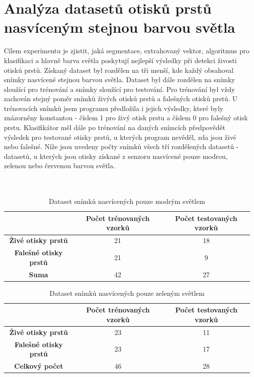\section{Analýza datasetů otisků prstů nasvíceným stejnou barvou světla}
Cílem experimentu je zjistit, jaká segmentace, extrahovaný vektor, algoritmus pro klasifikaci a hlavně barva světla poskytují nejlepší výsledky při detekci živosti otisků prstů. Získaný dataset byl rozdělen na tři menší, kde každý obsahoval snímky nasvícené stejnou barvou světla. Dataset byl dále rozdělen na snímky sloužící pro trénování a snímky sloužící pro testování. Pro trénování byl vždy zachován stejný poměr snímků živých otisků prstů a falešných otisků prstů. U trénovacích snímků jsem programu předložila i jejich výsledky, které byly znázorněny konstantou - číslem 1 pro živý otisk prstu a číslem 0 pro falešný otisk prstu. Klasifikátor měl dále po trénování na daných snímcích předpovědět výsledek pro testované otisky prstů, u kterých program nevěděl, zda jsou živé nebo falešné. Níže jsou uvedeny počty snímků všech tří rozdělených datasetů - datasetů, u kterých jsou otisky získané z senzoru nasvícené pouze modrou, zelenou nebo červenou barvou světla. \\\\\

\capstartfalse
\begin{table}[!htbp]
\centering
\begin{tabular}{|c|c|c|}
\hline
\textbf{}                     & \textbf{Počet trénovaných vzorků} & \textbf{Počet testovaných vzorků} \\ \hline
\textbf{Živé otisky prstů}    & 21                                & 18                                \\ \hline
\textbf{Falešné otisky prstů} & 21                                & 9                                \\ \hline
\textbf{Suma}               & 42                                & 27                                \\ \hline
\end{tabular}
\caption{Dataset snímků nasvícených pouze modrým světlem}
\end{table}
\capstarttrue

\capstartfalse
\begin{table}[!htbp]
\centering
\begin{tabular}{|c|c|c|}
\hline
\textbf{}                     & \textbf{Počet trénovaných vzorků} & \textbf{Počet testovaných vzorků} \\ \hline
\textbf{Živé otisky prstů}    & 23                                & 11                                \\ \hline
\textbf{Falešné otisky prstů} & 23                                & 17                                \\ \hline
\textbf{Celkový počet}               & 46                                & 28                                \\ \hline
\end{tabular}
\caption{Dataset snímků nasvícených pouze zeleným světlem}
\end{table}
\capstarttrue

